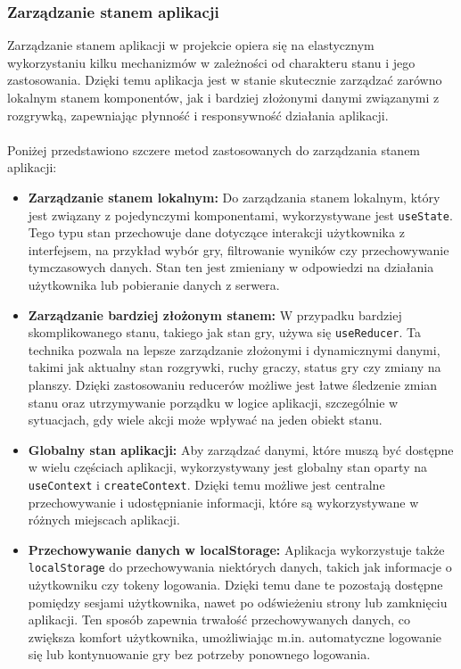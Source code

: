 \documentclass[12pt,a4paper]{article}
\begin{document}
\newpage

\subsubsection{Zarządzanie stanem aplikacji}
Zarządzanie stanem aplikacji w projekcie opiera się na elastycznym wykorzystaniu kilku mechanizmów w zależności od charakteru stanu i jego zastosowania. Dzięki temu aplikacja jest w stanie skutecznie zarządzać zarówno lokalnym stanem komponentów, jak i bardziej złożonymi danymi związanymi z rozgrywką, zapewniając płynność i responsywność działania aplikacji.
\\\\
Poniżej przedstawiono szczere metod zastosowanych do zarządzania stanem aplikacji:

\begin{itemize}
    \item \textbf{Zarządzanie stanem lokalnym:} Do zarządzania stanem lokalnym, który jest związany z pojedynczymi komponentami, wykorzystywane jest \texttt{useState}. Tego typu stan przechowuje dane dotyczące interakcji użytkownika z interfejsem, na przykład wybór gry, filtrowanie wyników czy przechowywanie tymczasowych danych. Stan ten jest zmieniany w odpowiedzi na działania użytkownika lub pobieranie danych z serwera.

    \item \textbf{Zarządzanie bardziej złożonym stanem:} W przypadku bardziej skomplikowanego stanu, takiego jak stan gry, używa się \texttt{useReducer}. Ta technika pozwala na lepsze zarządzanie złożonymi i dynamicznymi danymi, takimi jak aktualny stan rozgrywki, ruchy graczy, status gry czy zmiany na planszy. Dzięki zastosowaniu reducerów możliwe jest łatwe śledzenie zmian stanu oraz utrzymywanie porządku w logice aplikacji, szczególnie w sytuacjach, gdy wiele akcji może wpływać na jeden obiekt stanu.

    \item \textbf{Globalny stan aplikacji:} Aby zarządzać danymi, które muszą być dostępne w wielu częściach aplikacji, wykorzystywany jest globalny stan oparty na \texttt{useContext} i \texttt{createContext}. Dzięki temu możliwe jest centralne przechowywanie i udostępnianie informacji, które są wykorzystywane w różnych miejscach aplikacji.

    \item \textbf{Przechowywanie danych w localStorage:} Aplikacja wykorzystuje także \texttt{localStorage} do przechowywania niektórych danych, takich jak informacje o użytkowniku czy tokeny logowania. Dzięki temu dane te pozostają dostępne pomiędzy sesjami użytkownika, nawet po odświeżeniu strony lub zamknięciu aplikacji. Ten sposób zapewnia trwałość przechowywanych danych, co zwiększa komfort użytkownika, umożliwiając m.in. automatyczne logowanie się lub kontynuowanie gry bez potrzeby ponownego logowania.


\end{itemize}
\end{document}
